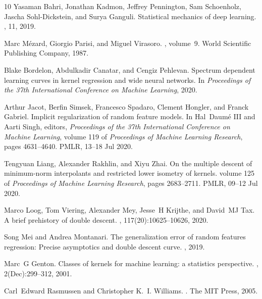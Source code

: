 \documentclass[11pt]{article}
\begin{document}
\begin{thebibliography}{10}
Yasaman Bahri, Jonathan Kadmon, Jeffrey Pennington, Sam Schoenholz, Jascha
  Sohl-Dickstein, and Surya Ganguli.
\newblock Statistical mechanics of deep learning.
, 11, 2019.

Marc M{\'e}zard, Giorgio Parisi, and Miguel Virasoro.
, volume~9.
\newblock World Scientific Publishing Company, 1987.

Blake Bordelon, Abdulkadir Canatar, and Cengiz Pehlevan.
\newblock Spectrum dependent learning curves in kernel regression and wide
  neural networks.
\newblock In {\em Proceedings of the 37th International Conference on Machine
  Learning}, 2020.

Arthur Jacot, Berfin Simsek, Francesco Spadaro, Clement Hongler, and Franck
  Gabriel.
\newblock Implicit regularization of random feature models.
\newblock In Hal~Daumé III and Aarti Singh, editors, {\em Proceedings of the
  37th International Conference on Machine Learning}, volume 119 of {\em
  Proceedings of Machine Learning Research}, pages 4631--4640. PMLR, 13--18 Jul
  2020.

Tengyuan Liang, Alexander Rakhlin, and Xiyu Zhai.
\newblock On the multiple descent of minimum-norm interpolants and restricted
  lower isometry of kernels.
\newblock volume 125 of {\em Proceedings of Machine Learning Research}, pages
  2683--2711. PMLR, 09--12 Jul 2020.

Marco Loog, Tom Viering, Alexander Mey, Jesse~H Krijthe, and David~MJ Tax.
\newblock A brief prehistory of double descent.
,
  117(20):10625--10626, 2020.

Song Mei and Andrea Montanari.
\newblock The generalization error of random features regression: Precise
  asymptotics and double descent curve.
, 2019.

Marc~G Genton.
\newblock Classes of kernels for machine learning: a statistics perspective.
, 2(Dec):299--312, 2001.

Carl~Edward Rasmussen and Christopher K.~I. Williams.
.
\newblock The MIT Press, 2005.


\end{thebibliography}
\end{document}
